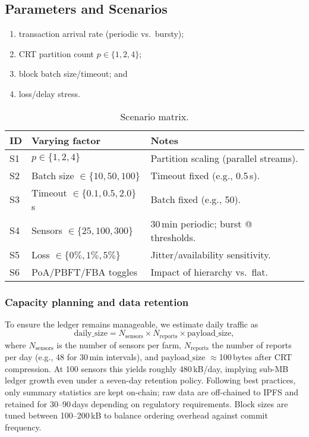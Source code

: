 \documentclass[12pt,onecolumn]{IEEEtran} %
\begin{document}
\subsection{Parameters and Scenarios}

\begin{enumerate}[label=(\roman*)]
  \item transaction arrival rate (periodic vs.\ bursty);
  \item CRT partition count $p\in\{1,2,4\}$;
  \item block batch size/timeout; and
  \item loss/delay stress.
\end{enumerate}


\begingroup
\setlength{\tabcolsep}{3pt}\footnotesize
\begin{table}[!t]
  \centering
  \caption{Scenario matrix.}
  \label{tab:scenarios-setup}
  \begin{tabularx}{\textwidth}{l l X}
    \toprule
    \textbf{ID} & \textbf{Varying factor} & \textbf{Notes} \\
    \midrule
    S1 & $p\in\{1,2,4\}$ & Partition scaling (parallel streams). \\
    S2 & Batch size $\in\{10,50,100\}$ & Timeout fixed (e.g., 0.5\,s). \\
    S3 & Timeout $\in\{0.1,0.5,2.0\}$\,s & Batch fixed (e.g., 50). \\
    S4 & Sensors $\in\{25,100,300\}$ & 30\,min periodic; burst @ thresholds. \\
    S5 & Loss $\in\{0\%,1\%,5\%\}$ & Jitter/availability sensitivity. \\
    S6 & PoA/PBFT/FBA toggles & Impact of hierarchy vs.\ flat. \\
    \bottomrule
  \end{tabularx}
\end{table}
\endgroup

\subsubsection{Capacity planning and data retention}
To ensure the ledger remains manageable, we estimate daily traffic as
\begin{equation}
  \text{daily\_size} = N_{\text{sensors}} \times N_{\text{reports}} \times \text{payload\_size},
\end{equation}
where $N_{\text{sensors}}$ is the number of sensors per farm, $N_{\text{reports}}$ the number of reports per day (e.g., 48 for 30\,min intervals), and $\text{payload\_size}$ $\approx$100\,bytes after CRT compression. At 100 sensors this yields roughly 480\,kB/day, implying sub-MB ledger growth even under a seven-day retention policy. Following best practices, only summary statistics are kept on-chain; raw data are off-chained to IPFS and retained for 30–90\,days depending on regulatory requirements. Block sizes are tuned between 100–200\,kB to balance ordering overhead against commit frequency.
\end{document}
